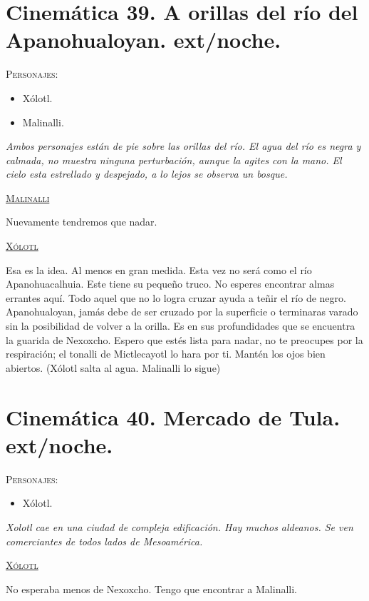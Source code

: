 \documentclass[11pt,letterpaper]{article}
\begin{document}
\section{Cinemática 39. A orillas del río del Apanohualoyan. ext/noche.}
 \textsc{Personajes}:
 \begin{itemize}
 \item Xólotl.
 \item Malinalli.
 \end{itemize}
\textit{Ambos personajes están de pie sobre las orillas del río. El agua del río es negra y calmada, no muestra ninguna perturbación, aunque la agites con la mano. El cielo esta estrellado y despejado, a lo lejos se observa un bosque.}
\begin{center}
\textsc{\underline{Malinalli}}
\\
\par
Nuevamente tendremos que nadar.
\\
\par
\textsc{\underline{Xólotl}}
\\
\par
Esa es la idea. Al menos en gran medida. Esta vez no será como el río Apanohuacalhuia. Este tiene su pequeño truco. No esperes encontrar almas errantes aquí. Todo aquel que no lo logra cruzar ayuda a teñir el río de negro. Apanohualoyan, jamás debe de ser cruzado por la superficie o terminaras varado sin la posibilidad de volver a la orilla. Es en sus profundidades que se encuentra la guarida de Nexoxcho. Espero que estés lista para nadar, no te preocupes por la respiración; el tonalli de Mictlecayotl lo hara por ti. Mantén los ojos bien abiertos.
(Xólotl salta al agua. Malinalli lo sigue)
\end{center}


\section{Cinemática 40. Mercado de Tula.  ext/noche. }
 \textsc{Personajes}:
 \begin{itemize}
 \item Xólotl.
 \end{itemize}
\textit{Xolotl cae en una ciudad de compleja edificación. Hay muchos aldeanos. Se ven comerciantes de todos lados de Mesoamérica.}
\begin{center}
\textsc{\underline{Xólotl}}
\\
\par
No esperaba menos de Nexoxcho. Tengo que encontrar a Malinalli.
\end{center}
 
\end{document}

